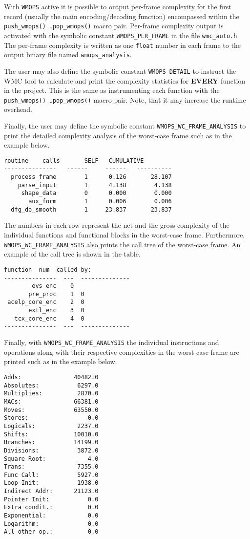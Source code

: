 With \verb|WMOPS| active it is possible to output per-frame complexity for the first record (usually the main encoding/decoding function) encompassed within the \verb|push_wmops()| \ldots \verb|pop_wmops()| macro pair. Per-frame complexity output is activated with the symbolic constant \verb|WMOPS_PER_FRAME| in the file \verb|wmc_auto.h|. The per-frame complexity is written as one \verb|float| number in each frame to the output binary file named \verb|wmops_analysis|.

The user may also define the symbolic constant \verb|WMOPS_DETAIL| to instruct the WMC tool to calculate and print the complexity statistics for \textbf{EVERY} function in the project. This is the same as instrumenting each function with the \verb|push_wmops()| \ldots \verb|pop_wmops()| macro pair. Note, that it may increase the runtime overhead.

Finally, the user may define the symbolic constant \verb|WMOPS_WC_FRAME_ANALYSIS| to print the detailed complexity analysis of the worst-case frame such as in the example below.

\begin{Verbatim}[fontsize=\small]
        routine    calls       SELF   CUMULATIVE
---------------   ------     ------   ----------
  process_frame        1      0.126       28.107
    parse_input        1      4.138        4.138
     shape_data        0      0.000        0.000
       aux_form        1      0.006        0.006
  dfg_do_smooth        1     23.837       23.837
\end{Verbatim}

The numbers in each row represent the net and the gross complexity of the individual functions and functional blocks in the worst-case frame. Furthermore, \verb|WMOPS_WC_FRAME_ANALYSIS| also prints the call tree of the worst-case frame. An example of the call tree is shown in the table.

\begin{Verbatim}[fontsize=\small]
       function  num  called by:
---------------  ---  --------------
        evs_enc    0
       pre_proc    1  0
 acelp_core_enc    2  0
       extl_enc    3  0
   tcx_core_enc    4  0
---------------  ---  --------------
\end{Verbatim}

Finally, with \verb|WMOPS_WC_FRAME_ANALYSIS| the individual instructions and operations along with their respective complexities in the worst-case frame are printed such as in the example below.

\begin{Verbatim}[fontsize=\small]
Adds:               40482.0
Absolutes:           6297.0
Multiplies:          2870.0
MACs:               66381.0
Moves:              63550.0
Stores:                 0.0
Logicals:            2237.0
Shifts:             10010.0
Branches:           14199.0
Divisions:           3872.0
Square Root:            4.0
Trans:               7355.0
Func Call:           5927.0
Loop Init:           1938.0
Indirect Addr:      21123.0
Pointer Init:           0.0
Extra condit.:          0.0
Exponential:            0.0
Logarithm:              0.0
All other op.:          0.0
\end{Verbatim}

